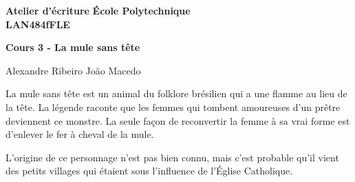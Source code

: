 \documentclass[10pt]{article} %
\newcommand{\createHeader}[6]{
	\noindent
	\normalsize\textbf{#2} \hfill \textbf{#1}\\
	\normalsize\textbf{#3} \hfill \textbf{\displaydate{#6}}\vspace{20pt}
	\centerline{\Large \textbf{#5}}\vspace{3pt}
	\centerline{\normalsize #4}\vspace{20pt}}
\begin{document}
	\createHeader{École Polytechnique}{Atelier d'écriture}{LAN484fFLE}{Alexandre Ribeiro João Macedo}{Cours 3 - La mule sans tête}{date}

La mule sans tête est un animal du folklore brésilien qui a une flamme au lieu de la tête. La légende raconte que les femmes qui tombent amoureuses d’un prêtre deviennent ce monstre. La seule façon de reconvertir la femme à sa vrai forme est d’enlever le fer à cheval de la mule.

L’origine de ce personnage n’est pas bien connu, mais c’est probable qu’il vient des petits villages qui étaient sous l’influence de l’Église Catholique. 
\end{document}

